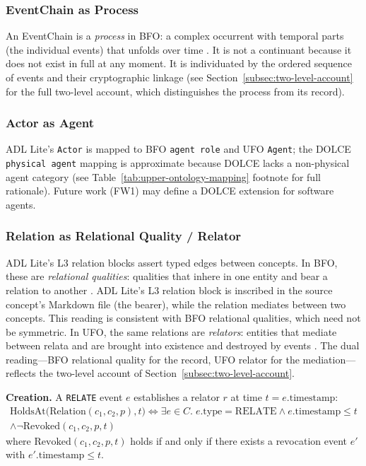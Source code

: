 \subsubsection{EventChain as Process}

An EventChain is a \emph{process} in BFO: a complex occurrent with temporal parts (the individual events) that unfolds over time \cite{bfo}. It is not a continuant because it does not exist in full at any moment. It is individuated by the ordered sequence of events and their cryptographic linkage (see Section~\ref{subsec:two-level-account} for the full two-level account, which distinguishes the process from its record).

\subsubsection{Actor as Agent}

ADL Lite's \texttt{Actor} is mapped to BFO \texttt{agent role} and UFO \texttt{Agent}; the DOLCE \texttt{physical agent} mapping is approximate because DOLCE lacks a non-physical agent category (see Table~\ref{tab:upper-ontology-mapping} footnote for full rationale). Future work (FW1) may define a DOLCE extension for software agents.

\subsubsection{Relation as Relational Quality / Relator}\label{subsec:relation-relator}

ADL Lite's L3 relation blocks assert typed edges between concepts. In BFO, these are \emph{relational qualities}: qualities that inhere in one entity and bear a relation to another \cite{bfo}. ADL Lite's L3 relation block is inscribed in the source concept's Markdown file (the bearer), while the relation mediates between two concepts. This reading is consistent with BFO relational qualities, which need not be symmetric. In UFO, the same relations are \emph{relators}: entities that mediate between relata and are brought into existence and destroyed by events \cite{ufo}. The dual reading---BFO relational quality for the record, UFO relator for the mediation---reflects the two-level account of Section~\ref{subsec:two-level-account}.

\textbf{Creation.} A \texttt{RELATE} event $e$ establishes a relator $r$ at time $t = e.\text{timestamp}$:
\begin{multline}\label{eq:relation-creation}
    \text{HoldsAt}\bigl(\text{Relation}(c_1, c_2, p), t\bigr) \iff \exists e \in C.\; e.\text{type} = \text{RELATE} \land e.\text{timestamp} \leq t \\
    \land \neg\text{Revoked}(c_1, c_2, p, t)
\end{multline}
where $\text{Revoked}(c_1, c_2, p, t)$ holds if and only if there exists a revocation event $e'$ with $e'.\text{timestamp} \leq t$.

